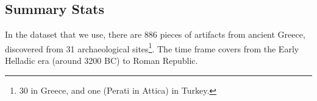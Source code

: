 \subsection{Summary Stats}
In the dataset that we use, there are 886 pieces of artifacts from ancient
Greece, discovered from 31 archaeological sites\footnote{30 in Greece, and one
    (Perati in Attica) in Turkey.}. The time frame covers from the 
Early Helladic era (around 3200 BC) to Roman Republic. 

